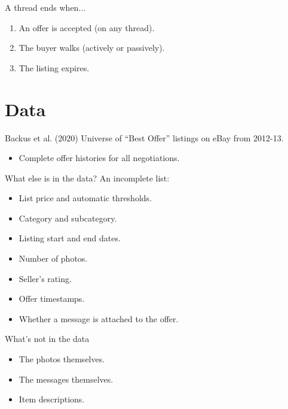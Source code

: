 \documentclass[aspectratio=169]{beamer}
\begin{document}
\begin{frame}{A thread ends when...}
	\begin{enumerate}
		\item An offer is accepted (on any thread).
		\item The buyer walks (actively or passively).
		\item The listing expires.
	\end{enumerate}		
\end{frame}

\section{Data}\label{sec:data}

\begin{frame}{Backus et al. (2020)}
	Universe of ``Best Offer'' listings on eBay from 2012-13.
	\begin{itemize}
		\item Complete offer histories for all negotiations.
	\end{itemize}
\end{frame}

\begin{frame}{What else is in the data?}
	An incomplete list:
	\begin{itemize}
		\item List price and automatic thresholds.
		\item Category and subcategory.
		\item Listing start and end dates.
		\item Number of photos.
		\item Seller's rating.
		\item Offer timestamps.
		\item Whether a message is attached to the offer.
	\end{itemize}
\end{frame}

\begin{frame}{What's not in the data}
	\begin{itemize}
		\item The photos themselves.
		\item The messages themselves.
		\item Item descriptions.
	\end{itemize}
\end{frame}

\begin{frame}
	\begin{figure}
		\centering
		\texttt{[image: \\detokenize\{w2v/w2v\_meta.png]}}
	\end{figure}
\end{frame}
\end{document}
